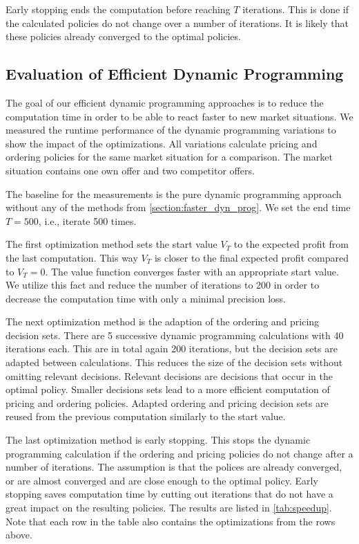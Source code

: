 Early stopping ends the computation before reaching $T$ iterations.
This is done if the calculated policies do not change over a number of iterations.
It is likely that these policies already converged to the optimal policies.

\subsection{Evaluation of Efficient Dynamic Programming}

The goal of our efficient dynamic programming approaches is to reduce the computation time in order to be able to react faster to new market situations.
We measured the runtime performance of the dynamic programming variations to show the impact of the optimizations.
All variations calculate pricing and ordering policies for the same market situation for a comparison.
The market situation contains one own offer and two competitor offers.


The baseline for the measurements is the pure dynamic programming approach without any of the methods from \cref{section:faster_dyn_prog}.
We set the end time $T = 500$, i.e., iterate 500 times.

The first optimization method sets the start value $V_T$ to the expected profit from the last computation.
This way $V_T$ is closer to the final expected profit compared to $V_T = 0$.
The value function converges faster with an appropriate start value.
We utilize this fact and reduce the number of iterations to 200 in order to decrease the computation time with only a minimal precision loss.

The next optimization method is the adaption of the ordering and pricing decision sets.
There are 5 successive dynamic programming calculations with 40 iterations each.
This are in total again 200 iterations, but the decision sets are adapted between calculations.
This reduces the size of the decision sets without omitting relevant decisions.
Relevant decisions are decisions that occur in the optimal policy.
Smaller decisions sets lead to a more efficient computation of pricing and ordering policies.
Adapted ordering and pricing decision sets are reused from the previous computation similarly to the start value.

The last optimization method is early stopping.
This stops the dynamic programming calculation if the ordering and pricing policies do not change after a number of iterations.
The assumption is that the polices are already converged, or are almost converged and are close enough to the optimal policy.
Early stopping saves computation time by cutting out iterations that do not have a great impact on the resulting policies.
The results are listed in \cref{tab:speedup}.
Note that each row in the table also contains the optimizations from the rows above.

